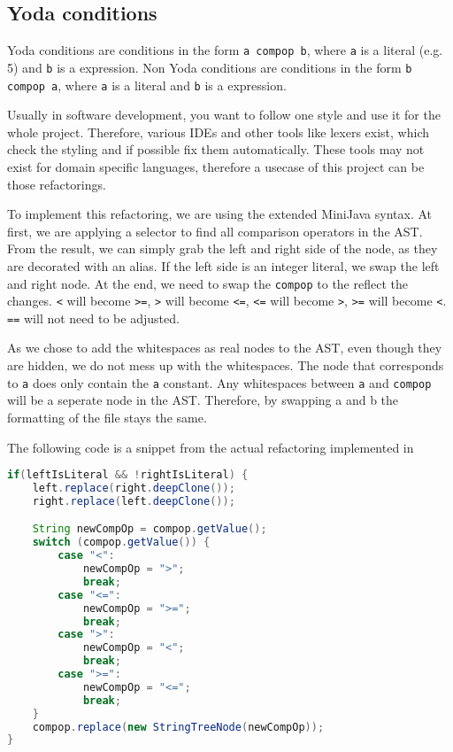 
\subsection{Yoda conditions}

Yoda conditions are conditions in the form \verb|a compop b|, where \verb|a| is a literal (e.g. 5) and \verb|b| is a expression.
Non Yoda conditions are conditions in the form \verb|b compop a|, where \verb|a| is a literal and \verb|b| is a expression.

Usually in software development, you want to follow one style and use it for the whole project. 
Therefore, various IDEs and other tools like lexers exist, which check
the styling and if possible fix them automatically. These tools may not exist for domain specific languages, 
therefore a usecase of this project can be those refactorings.

To implement this refactoring, we are using the extended MiniJava syntax. 
At first, we are applying a selector to find all comparison operators in the AST.
From the result, we can simply grab the left and right side of the node, as they are decorated with an alias. 
If the left side is an integer literal, we swap the left and right node.
At the end, we need to swap the \verb|compop| to the reflect the changes. 
\verb|<| will become \verb|>=|, \verb|>| will become \verb|<=|, \verb|<=| will become \verb|>|, \verb|>=| will become \verb|<|.
\verb|==| will not need to be adjusted.

As we chose to add the whitespaces as real nodes to the AST, even though they are hidden, we do not mess up with the whitespaces.
The node that corresponds to \verb|a| does only contain the \verb|a| constant. 
Any whitespaces between \verb|a| and \verb|compop| will be a seperate node in the AST. Therefore, by swapping a and b the formatting
of the file stays the same.

The following code is a snippet from the actual refactoring implemented in \cite{yoda_refactoring}

\begin{lstlisting}[language=Java, caption=Refactor Yoda conditions]
if(leftIsLiteral && !rightIsLiteral) {
    left.replace(right.deepClone());
    right.replace(left.deepClone());

    String newCompOp = compop.getValue();
    switch (compop.getValue()) {
        case "<":
            newCompOp = ">";
            break;
        case "<=":
            newCompOp = ">=";
            break;
        case ">":
            newCompOp = "<";
            break;
        case ">=":
            newCompOp = "<=";
            break;
    }
    compop.replace(new StringTreeNode(newCompOp));
}
\end{lstlisting}
